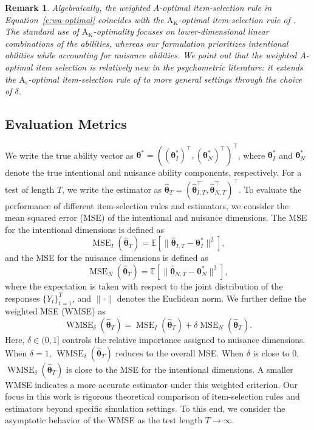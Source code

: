 \documentclass[12pt]{article}
\newcommand{\bftheta}{\boldsymbol{\theta}}
\newtheorem{remark}[theorem]{Remark}
\begin{document}
\begin{remark}
Algebraically, the weighted A-optimal item-selection rule in Equation~\eqref{e:wa-optimal} coincides with the $\operatorname{A_K}$-optimal item-selection rule of . The standard use of $\operatorname{A_K}$-optimality focuses on lower-dimensional linear combinations of the abilities, whereas our formulation prioritizes intentional abilities while accounting for nuisance abilities. We point out that the weighted A-optimal item selection is relatively new in the psychometric literature: it extends the $\operatorname{A_s}$-optimal item-selection rule of  to more general settings through the choice of $\delta$.
\end{remark}




\subsection{Evaluation Metrics} \label{sub:evaluation}
We write the true ability vector as $\bftheta^{\ast} = ((\bftheta^{\ast}_I)^{\top}, (\bftheta^{\ast}_N)^{\top})^{\top}$, where $\bftheta^{\ast}_I$ and $\bftheta^{\ast}_N$ denote the true intentional and nuisance ability components, respectively. For a test of length $T$, we write the estimator as $\hat{\bftheta}_T = (\hat{\bftheta}_{I,T}^{\top}, \hat{\bftheta}_{N,T}^{\top})^{\top}$. To evaluate the performance of different item-selection rules and estimators, we consider the mean squared error (MSE) of the intentional and nuisance dimensions. The MSE for the intentional dimensions is defined as
\begin{equation*}
\operatorname{MSE}_I(\hat{\bftheta}_T)=\mathbb{E}[\|\hat{\bftheta}_{I,T}-\bftheta_I^\ast\|^2],
\end{equation*}
and the MSE for the nuisance dimensions is defined as 
\begin{equation*}
\operatorname{MSE}_N(\hat{\bftheta}_T) = \mathbb{E}[\|\hat{\bftheta}_{N,T}-\bftheta_N^\ast\|^2],
\end{equation*}
where the expectation is taken with respect to the joint distribution of the responses $\{Y_t\}_{t=1}^T$, and $\|\cdot\|$ denotes the Euclidean norm. We further define the weighted MSE (WMSE) as 
\begin{equation*}
\operatorname{WMSE}_{\delta}(\hat{\bftheta}_T)=\operatorname{MSE}_I(\hat{\bftheta}_T)+\delta \operatorname{MSE}_N(\hat{\bftheta}_T).
\end{equation*}
Here, $\delta \in (0,1]$ controls the relative importance assigned to nuisance dimensions. When $\delta=1$, $\operatorname{WMSE}_{\delta}(\hat{\bftheta}_T)$ reduces to the overall MSE. When $\delta$ is close to $0$, $\operatorname{WMSE}_{\delta}(\hat{\bftheta}_T)$ is close to the MSE for the intentional dimensions. A smaller WMSE indicates a more accurate estimator under this weighted criterion. Our focus in this work is rigorous theoretical comparison of item-selection rules and estimators beyond specific simulation settings. To this end, we consider the asymptotic behavior of the WMSE as the test length $T\to\infty$.
\end{document}
